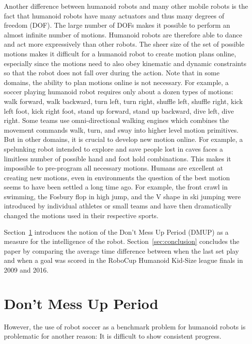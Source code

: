 \documentclass[runningheads]{llncs}
\begin{document}
Another difference between humanoid robots and many other mobile robots is the fact that humanoid robots have many actuators and thus many degrees of freedom (DOF).
The large number of DOFs makes it possible to perform an almost infinite number of motions.
Humanoid robots are therefore able to dance and act more expressively than other robots.
The sheer size of the set of possible motions makes it difficult for a humanoid robot to create motion plans online, especially since the motions need to also obey kinematic and dynamic constraints so that the robot does not fall over during the action.
Note that in some domains, the ability to plan motions online is not necessary. 
For example, a soccer playing humanoid robot requires only about a dozen types of motions: walk forward, walk backward, turn left, turn right, shuffle left, shuffle right, kick left foot, kick right foot, stand up forward, stand up backward, dive left, dive right.
Some teams use omni-directional walking engines which combines the movement commands walk, turn, and sway into higher level motion primitives.
But in other domains, it is crucial to develop new motion online. 
For example, a spelunking robot intended to explore and save people lost in caves faces a limitless number of possible hand and foot hold combinations.
This makes it impossible to pre-program all necessary motions.
Humans are excellent at creating new motions, even in environments the question of the best motion seems to have been settled a long time ago.
For example, the front crawl in swimming, the Fosbury flop in high jump, and the V shape in ski jumping were introduced by individual athletes or small teams and have then dramatically changed the motions used in their respective sports.

Section~\ref{sec:dmup} introduces the notion of the Don't Mess Up Period (DMUP) as a measure for the intelligence of the robot.
Section~\ref{sec:conclusion} concludes the paper by comparing the average time difference between when the last set play and when a goal was scored in the RoboCup Humanoid Kid-Size league finals in 2009 and 2016.

\section{Don't Mess Up Period}
\label{sec:dmup}

However, the use of robot soccer as a benchmark problem for humanoid robots is problematic for another reason: It is difficult to show consistent progress.
\end{document}
